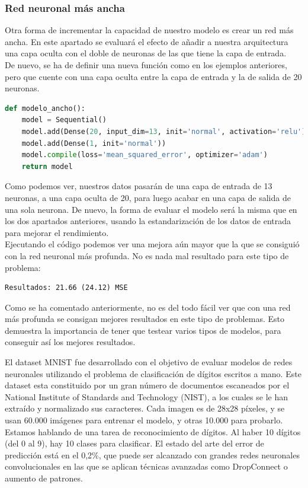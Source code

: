 \subsubsection{Red neuronal más ancha}
Otra forma de incrementar la capacidad de nuestro modelo es crear un red más ancha. En este apartado se evaluará el efecto de añadir a nuestra arquitectura una capa oculta con el doble de neuronas de las que tiene la capa de entrada.\\
De nuevo, se ha de definir una nueva función como en los ejemplos anteriores, pero que cuente con una capa oculta entre la capa de entrada y la de salida de 20 neuronas.
\begin{lstlisting}[language=Python]
def modelo_ancho():
	model = Sequential()
	model.add(Dense(20, input_dim=13, init='normal', activation='relu'))
	model.add(Dense(1, init='normal'))
	model.compile(loss='mean_squared_error', optimizer='adam')
	return model
\end{lstlisting}
Como podemos ver, nuestros datos pasarán de una capa de entrada de 13 neuronas, a una capa oculta de 20, para luego acabar en una capa de salida de una sola neurona. De nuevo, la forma de evaluar el modelo será la misma que en los dos apartados anteriores, usando la estandarización de los datos de entrada para mejorar el rendimiento.\\
Ejecutando el código podemos ver una mejora aún mayor que la que se consiguió con la red neuronal más profunda. No es nada mal resultado para este tipo de problema:
\begin{lstlisting}
Resultados: 21.66 (24.12) MSE
\end{lstlisting}
Como se ha comentado anteriormente, no es del todo fácil ver que con una red más profunda se consigan mejores resultados en este tipo de problemas. Esto demuestra la importancia de tener que testear varios tipos de modelos, para conseguir así los mejores resultados.

El dataset MNIST fue desarrollado con el objetivo de evaluar modelos de redes neuronales utilizando el problema de clasificación de dígitos escritos a mano. Este dataset esta constituido por un gran número de documentos escaneados por el National Institute of Standards and Technology (NIST), a los cuales se le han extraído y normalizado sus caracteres. Cada imagen es de 28x28 píxeles, y se usan 60.000 imágenes para entrenar el modelo, y otras 10.000 para probarlo.\\
Estamos hablando de una tarea de reconocimiento de dígitos. Al haber 10 dígitos (del 0 al 9), hay 10 clases para clasificar. El estado del arte del error de predicción está en el 0,2\%, que puede ser alcanzado con grandes redes neuronales convolucionales en las que se aplican técnicas avanzadas como DropConnect o aumento de patrones.\\
